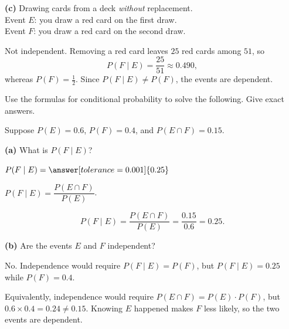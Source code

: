 \documentclass[12pt]{ximera}
\begin{document}
\begin{problem}
\begin{prompt}
\textbf{(c)} Drawing cards from a deck \emph{without} replacement. \\
Event $E$: you draw a red card on the first draw. \\
Event $F$: you draw a red card on the second draw.

\begin{multipleChoice}
\end{multipleChoice}

\begin{feedback}
Not independent. Removing a red card leaves $25$ red cards among $51$, so
\[ P(F\mid E)=\frac{25}{51}\approx 0.490, \]
whereas $P(F)=\frac12$. Since $P(F\mid E)\neq P(F)$, the events are dependent.
\end{feedback}
\end{prompt}
\end{problem}

\begin{problem}
Use the formulas for conditional probability to solve the following. Give exact
answers.

Suppose $P(E)=0.6$, $P(F)=0.4$, and $P(E\cap F)=0.15$.

\begin{prompt}
\textbf{(a)} What is $P(F\mid E)$?

$P(F\mid E) = \answer[tolerance=0.001]{0.25}$

\begin{hint}
$P(F\mid E)=\dfrac{P(E\cap F)}{P(E)}$.
\end{hint}

\begin{feedback}
\[
P(F\mid E)=\frac{P(E\cap F)}{P(E)}=\frac{0.15}{0.6}=0.25.
\]
\end{feedback}
\end{prompt}

\begin{prompt}
\textbf{(b)} Are the events $E$ and $F$ independent?

\begin{multipleChoice}
\end{multipleChoice}

\begin{feedback}
No. Independence would require $P(F\mid E)=P(F)$, but $P(F\mid E)=0.25$ while
$P(F)=0.4$.

Equivalently, independence would require $P(E\cap F)=P(E)\cdot P(F)$, but
$0.6\times 0.4 = 0.24 \neq 0.15$. Knowing $E$ happened makes $F$ less likely, so the
two events are dependent.
\end{feedback}
\end{prompt}
\end{problem}
\end{document}

